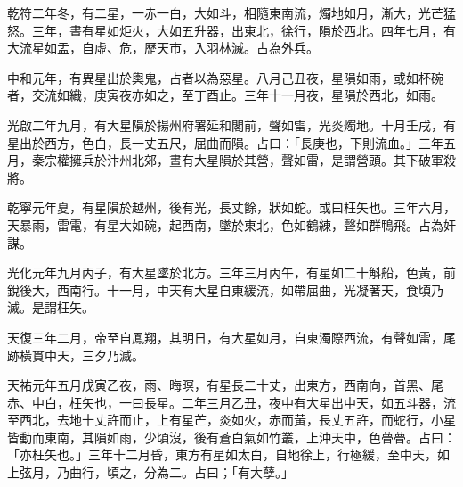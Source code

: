 \begin{pinyinscope}
 乾符二年冬，有二星，一赤一白，大如斗，相隨東南流，燭地如月，漸大，光芒猛怒。三年，晝有星如炬火，大如五升器，出東北，徐行，隕於西北。四年七月，有大流星如盂，自虛、危，歷天市，入羽林滅。占為外兵。



 中和元年，有異星出於輿鬼，占者以為惡星。八月己丑夜，星隕如雨，或如杯碗者，交流如織，庚寅夜亦如之，至丁酉止。三年十一月夜，星隕於西北，如雨。



 光啟二年九月，有大星隕於揚州府署延和閣前，聲如雷，光炎燭地。十月壬戌，有星出於西方，色白，長一丈五尺，屈曲而隕。占曰：「長庚也，下則流血。」三年五月，秦宗權擁兵於汴州北郊，晝有大星隕於其營，聲如雷，是謂營頭。其下破軍殺將。



 乾寧元年夏，有星隕於越州，後有光，長丈餘，狀如蛇。或曰枉矢也。三年六月，天暴雨，雷電，有星大如碗，起西南，墜於東北，色如鶴練，聲如群鴨飛。占為奸謀。



 光化元年九月丙子，有大星墜於北方。三年三月丙午，有星如二十斛船，色黃，前銳後大，西南行。十一月，中天有大星自東緩流，如帶屈曲，光凝著天，食頃乃滅。是謂枉矢。



 天復三年二月，帝至自鳳翔，其明日，有大星如月，自東濁際西流，有聲如雷，尾跡橫貫中天，三夕乃滅。



 天祐元年五月戊寅乙夜，雨、晦暝，有星長二十丈，出東方，西南向，首黑、尾赤、中白，枉矢也，一曰長星。二年三月乙丑，夜中有大星出中天，如五斗器，流至西北，去地十丈許而止，上有星芒，炎如火，赤而黃，長丈五許，而蛇行，小星皆動而東南，其隕如雨，少頃沒，後有蒼白氣如竹叢，上沖天中，色瞢瞢。占曰：「亦枉矢也。」三年十二月昏，東方有星如太白，自地徐上，行極緩，至中天，如上弦月，乃曲行，頃之，分為二。占曰；「有大孽。」



\end{pinyinscope}